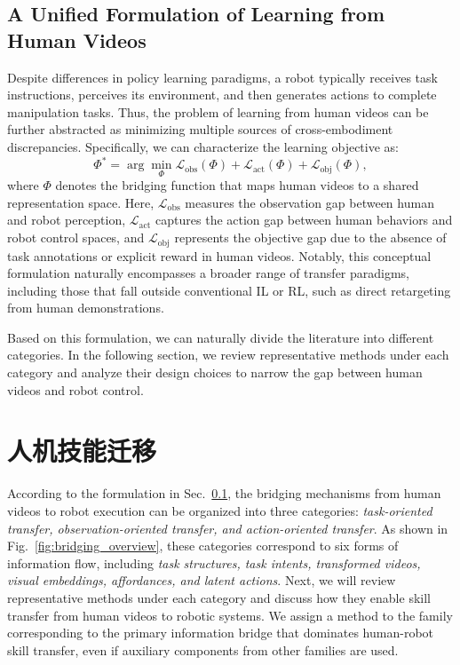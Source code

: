 \documentclass[Afour,sageh,times]{sagej}
\begin{document}
\subsection{A Unified Formulation of Learning from Human Videos} \label{sec:unified_formulation}

Despite differences in policy learning paradigms, a robot typically receives task instructions, perceives its environment, and then generates actions to complete manipulation tasks. Thus, the problem of learning from human videos can be further abstracted as minimizing multiple sources of cross-embodiment discrepancies. Specifically, we can characterize the learning objective as:
\begin{equation}
\Phi^* = \arg\min_{\Phi} 
\mathcal{L}_{\text{obs}}(\Phi) + 
\mathcal{L}_{\text{act}}(\Phi) + 
\mathcal{L}_{\text{obj}}(\Phi),
\end{equation}
where $\Phi$ denotes the bridging function that maps human videos to a shared representation space. Here, $\mathcal{L}_{\text{obs}}$ measures the observation gap between human and robot perception, $\mathcal{L}_{\text{act}}$ captures the action gap between human behaviors and robot control spaces, and $\mathcal{L}_{\text{obj}}$ represents the objective gap due to the absence of task annotations or explicit reward in human videos. Notably, this conceptual formulation naturally encompasses a broader range of transfer paradigms, including those that fall outside conventional IL or RL, such as direct retargeting from human demonstrations. 


Based on this formulation, we can naturally divide the literature into different categories. In the following section, we review representative methods under each category and analyze their design choices to narrow the gap between human videos and robot control.


\section{人机技能迁移} \label{sec:hr_skill_transfer}

According to the formulation in Sec.~\ref{sec:unified_formulation}, the bridging mechanisms from human videos to robot execution can be organized into three categories: \textit{task-oriented transfer, observation-oriented transfer, and action-oriented transfer}. As shown in Fig.~\ref{fig:bridging_overview}, these categories correspond to six forms of information flow, including \textit{task structures, task intents, transformed videos, visual embeddings, affordances, and latent actions}. Next, we will review representative methods under each category and discuss how they enable skill transfer from human videos to robotic systems. We assign a method to the family corresponding to the primary information bridge that dominates human-robot skill transfer, even if auxiliary components from other families are used.
\end{document}
